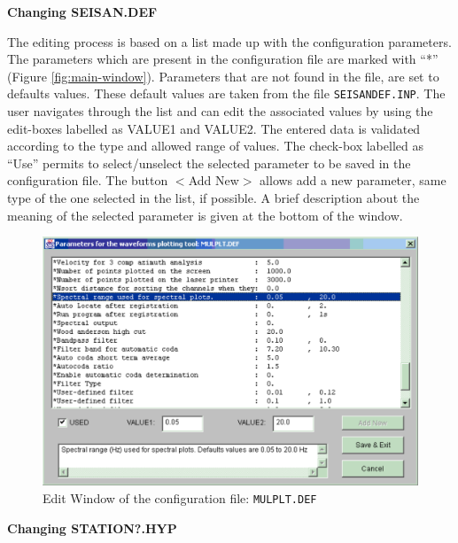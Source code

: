 \textbf{Changing SEISAN.DEF}

The editing process is based on a list made up with the configuration 
parameters. The parameters which are present in the configuration 
file are marked with ``*'' (Figure \ref{fig:main-window}). Parameters 
that are not found in the file, are set to defaults values. These 
default values are taken from the file \texttt{SEISANDEF.INP}. The user 
navigates through the list and can edit the associated values by using 
the edit-boxes labelled as VALUE1 and VALUE2. The entered data is 
validated according to the type and allowed range of values. The check-box 
labelled as ``Use'' permits to select/unselect the selected parameter 
to be saved in the configuration file. The button $<$Add New$> $ allows 
add a new parameter, same type of the one selected in the list, if 
possible. A brief description about the meaning of the selected parameter 
is given at the bottom of the window. 

\begin{figure}
\centerline{\includegraphics[width=0.9\linewidth]{fig/fig3}}
\caption{Edit Window of the configuration file: \texttt{MULPLT.DEF}}
\label{fig:edit-mulplt.def}
\end{figure}

\textbf{Changing STATION?.HYP}

